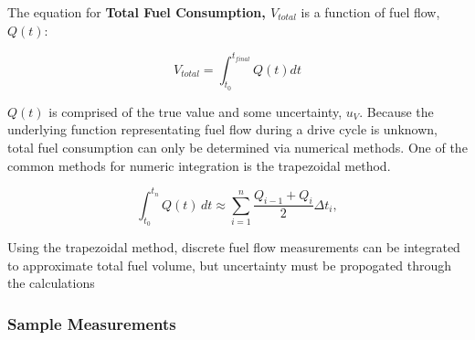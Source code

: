 \documentclass[11pt]{article}
\begin{document}
    The equation for \textbf{Total Fuel Consumption, \(V_{total}\)} is a
function of fuel flow, \(Q(t)\):

\[V_{total} = \int_{t_0}^{t_{final}} Q(t)dt\]

\(Q(t)\) is comprised of the true value and some uncertainty, \(u_V\).
Because the underlying function representating fuel flow during a drive
cycle is unknown, total fuel consumption can only be determined via
numerical methods. One of the common methods for numeric integration is
the trapezoidal method.

\[\int_{t_0}^{t_n} Q(t)\, dt \approx \sum_{i=1}^n \frac{Q_{i-1} + Q_i}{2} \Delta t_i,\]

Using the trapezoidal method, discrete fuel flow measurements can be
integrated to approximate total fuel volume, but uncertainty must be
propogated through the calculations

    \hypertarget{sample-measurements}{%
\subsubsection{Sample Measurements}\label{sample-measurements}}
\end{document}
